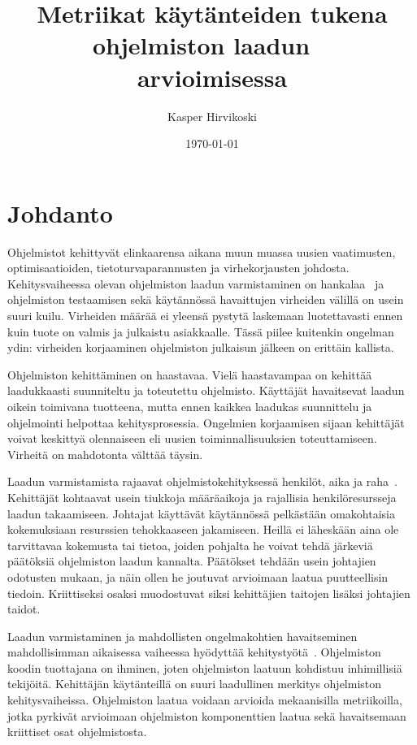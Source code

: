\documentclass[finnish]{../tktltiki2}
\title{Metriikat käytänteiden tukena ohjelmiston laadun \ \\arvioimisessa}
\author{Kasper Hirvikoski}
\date{\today}
\theoremstyle{definition}
\theoremstyle{remark}
\begin{document}

\maketitle
\makeabstract

\tableofcontents
\newpage


\section{Johdanto}

Ohjelmistot kehittyvät elinkaarensa aikana muun muassa uusien vaatimusten, optimisaatioiden, tietoturvaparannusten ja 
virhekorjausten johdosta. Kehitysvaiheessa olevan ohjelmiston laadun varmistaminen on 
hankalaa~\cite{BBM96, NB05, NB07, ZN08, MNDT09} ja ohjelmiston testaamisen sekä käytännössä havaittujen virheiden välillä 
on usein suuri kuilu. Virheiden määrää ei yleensä pystytä laskemaan luotettavasti ennen kuin tuote on valmis ja 
julkaistu asiakkaalle. Tässä piilee kuitenkin ongelman ydin: virheiden korjaaminen ohjelmiston julkaisun jälkeen on 
erittäin kallista.

    Ohjelmiston kehittäminen on haastavaa. Vielä haastavampaa on kehittää laadukkaasti suunniteltu ja toteutettu 
ohjelmisto. Käyttäjät havaitsevat laadun oikein toimivana tuotteena, mutta ennen kaikkea laadukas suunnittelu ja 
ohjelmointi helpottaa kehitysprosessia.  Ongelmien korjaamisen sijaan kehittäjät voivat keskittyä olennaiseen eli uusien 
toiminnallisuuksien toteuttamiseen. Virheitä on mahdotonta välttää täysin.

    Laadun varmistamista rajaavat ohjelmistokehityksessä henkilöt, aika ja raha~\cite{BBM96, ZN08}. Kehittäjät kohtaavat 
usein tiukkoja määräaikoja ja rajallisia henkilöresursseja laadun takaamiseen. Johtajat käyttävät käytännössä pelkästään 
omakohtaisia kokemuksiaan resurssien tehokkaaseen jakamiseen. Heillä ei läheskään aina ole tarvittavaa kokemusta tai 
tietoa, joiden pohjalta he voivat tehdä järkeviä päätöksiä ohjelmiston laadun kannalta. Päätökset tehdään usein 
johtajien odotusten mukaan, ja näin ollen he joutuvat arvioimaan laatua puutteellisin tiedoin. Kriittiseksi osaksi 
muodostuvat siksi kehittäjien taitojen lisäksi johtajien taidot.

    Laadun varmistaminen ja mahdollisten ongelmakohtien havaitseminen mahdollisimman aikaisessa vaiheessa hyödyttää 
kehitystyötä~\cite{BBM96, NB05}. Ohjelmiston koodin tuottajana on ihminen, joten ohjelmiston laatuun kohdistuu 
inhimillisiä tekijöitä. Kehittäjän käytänteillä on suuri laadullinen merkitys ohjelmiston kehitysvaiheissa. Ohjelmiston 
laatua voidaan arvioida mekaanisilla metriikoilla, jotka pyrkivät arvioimaan ohjelmiston komponenttien laatua sekä 
havaitsemaan kriittiset osat ohjelmistosta.
\end{document}
